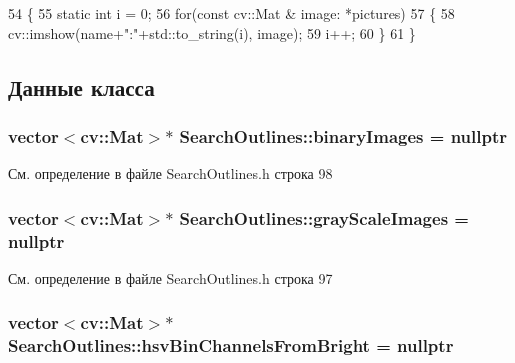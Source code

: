 \begin{DoxyCode}
54 \{
55     \textcolor{keyword}{static} \textcolor{keywordtype}{int} i = 0;
56     \textcolor{keywordflow}{for}(\textcolor{keyword}{const} cv::Mat & image: *pictures)
57     \{
58         cv::imshow(name+\textcolor{stringliteral}{":"}+std::to\_string(i), image);
59         i++;
60     \}
61 \}
\end{DoxyCode}


\subsection{Данные класса}
\hypertarget{class_search_outlines_ad32573709b7db29f00e5444110b37d23}{
\subsubsection[{binary\+Images}]{\setlength{\rightskip}{0pt plus 5cm}vector$<$cv\+::\+Mat$>$$\ast$ Search\+Outlines\+::binary\+Images = nullptr\hspace{0.3cm}{\ttfamily [private]}}}\label{class_search_outlines_ad32573709b7db29f00e5444110b37d23}


См. определение в файле Search\+Outlines.\+h строка 98

\hypertarget{class_search_outlines_a2284f3f55022613e11f2d023a6b76e07}{
\subsubsection[{gray\+Scale\+Images}]{\setlength{\rightskip}{0pt plus 5cm}vector$<$cv\+::\+Mat$>$$\ast$ Search\+Outlines\+::gray\+Scale\+Images = nullptr\hspace{0.3cm}{\ttfamily [private]}}}\label{class_search_outlines_a2284f3f55022613e11f2d023a6b76e07}


См. определение в файле Search\+Outlines.\+h строка 97

\hypertarget{class_search_outlines_a1eb23566d056c92a441067d8c9cd03ae}{
\subsubsection[{hsv\+Bin\+Channels\+From\+Bright}]{\setlength{\rightskip}{0pt plus 5cm}vector$<$cv\+::\+Mat$>$$\ast$ Search\+Outlines\+::hsv\+Bin\+Channels\+From\+Bright = nullptr\hspace{0.3cm}{\ttfamily [private]}}}\label{class_search_outlines_a1eb23566d056c92a441067d8c9cd03ae}


